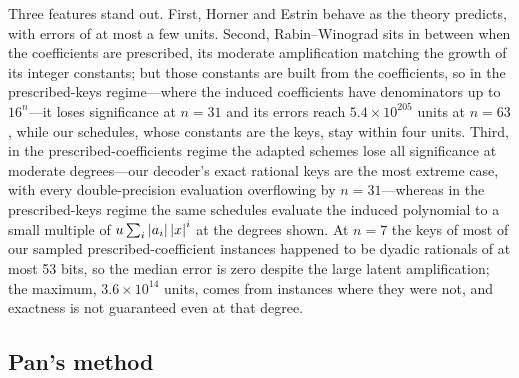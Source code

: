 Three features stand out.  First, Horner and Estrin behave as the theory
predicts, with errors of at most a few units.  Second, Rabin--Winograd sits in
between when the coefficients are prescribed, its moderate amplification
matching the growth of its integer constants; but those constants are built
from the coefficients, so in the prescribed-keys regime---where the induced
coefficients have denominators up to $16^n$---it loses significance at
$n=31$ and its errors reach $5.4\times10^{205}$ units at $n=63$, while our schedules, whose constants are the
keys, stay within four units.  Third, in the prescribed-coefficients regime the adapted schemes
lose all significance at moderate degrees---our decoder's exact rational keys
are the most extreme case, with every double-precision evaluation overflowing
by $n=31$---whereas in the prescribed-keys regime the same schedules evaluate
the induced polynomial to a small multiple of $u\sum_i\left\lvert a_i\right\rvert\left\lvert x\right\rvert^i$ at
the degrees shown.  At $n=7$ the keys of most of our sampled prescribed-coefficient
instances happened to be dyadic rationals of at most 53 bits, so the median
error is zero despite the large latent amplification; the maximum,
$3.6\times10^{14}$ units, comes from instances where they were not, and
exactness is not guaranteed even at that degree.

\subsection{Pan's method}
\label{sec:numstab-pan}


